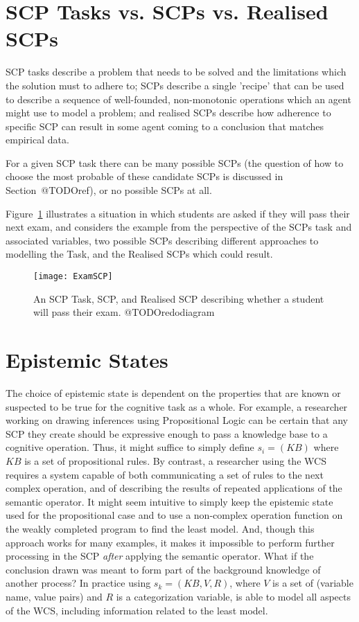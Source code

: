 \section{SCP Tasks vs. SCPs vs. Realised SCPs}

SCP tasks describe a problem that needs to be solved and the limitations which the solution must to adhere to; SCPs describe a single 'recipe' that can be used to describe a sequence of well-founded, non-monotonic operations which an agent might use to model a problem; and realised SCPs describe how adherence to specific SCP can result in some agent coming to a conclusion that matches empirical data.

For a given SCP task there can be many possible SCPs (the question of how to choose the most probable of these candidate SCPs is discussed in Section~@TODOref), or no possible SCPs at all.

Figure~\ref{fig:scpExam} illustrates a situation in which students are asked if they will pass their next exam, and considers the example from the perspective of the SCPs task and associated variables, two possible SCPs describing different approaches to modelling the Task, and the Realised SCPs which could result.

\begin{figure}
\begin{center}
\texttt{[image: ExamSCP]}
\end{center}
\caption{An SCP Task, SCP, and Realised SCP describing whether a student will pass their exam. @TODOredodiagram}
\label{fig:scpExam}
\end{figure}

\section{Epistemic States}
The choice of epistemic state is dependent on the properties that are known or suspected to be true for the cognitive task as a whole. For example, a researcher working on drawing inferences using Propositional Logic can be certain that any SCP they create should be expressive enough to pass a knowledge base to a cognitive operation. Thus, it might suffice to simply define $s_i=(KB)$ where $KB$ is a set of propositional rules. By contrast, a researcher using the WCS requires a system capable of both communicating a set of rules to the next complex operation, and of describing the results of repeated applications of the semantic operator. It might seem intuitive to simply keep the epistemic state used for the propositional case and to use a non-complex operation function on the weakly completed program to find the least model. And, though this approach works for many examples, it makes it impossible to perform further processing in the SCP \textit{after} applying the semantic operator. What if the conclusion drawn was meant to form part of the background knowledge of another process? In practice using $s_k=(KB,V, R)$, where $V$ is a set of (variable name, value pairs) and $R$ is a categorization variable, is able to model all aspects of the WCS, including information related to the least model. 

